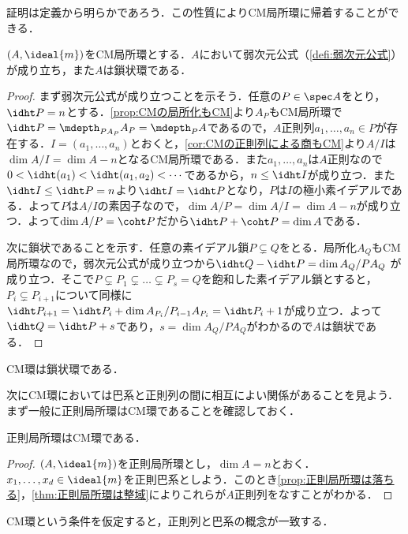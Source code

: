 証明は定義から明らかであろう．この性質によりCM局所環に帰着することができる．

\begin{thm}
	$(A,\ideal{m})$をCM局所環とする．$A$において弱次元公式（\ref{defi:弱次元公式}）が成り立ち，また$A$は鎖状環である．
\end{thm}

\begin{proof}
	まず弱次元公式が成り立つことを示そう．任意の$P\in\spec A$をとり，$\idht P=n$とする．\ref{prop:CMの局所化もCM}より$A_P$もCM局所環で$\idht P=\mdepth_{PA_P} A_P=\mdepth_P A$であるので，$A$正則列$a_1,\dots,a_n\in P$が存在する．$I=(a_1,\dots,a_n)$とおくと，\ref{cor:CMの正則列による商もCM}より$A/I$は$\dim A/I=\dim A-n$となるCM局所環である．また$a_1,\dots,a_n$は$A$正則なので$0<\idht(a_1)<\idht(a_1,a_2)<\cdots$であるから，$n\leq\idht I$が成り立つ．また$\idht I\leq\idht P=n$より$\idht I=\idht P$となり，$P$は$I$の極小素イデアルである．よって$P$は$A/I$の素因子なので，$\dim A/P=\dim A/I=\dim A-n$が成り立つ．よって$\dim A/P=\coht P$だから$\idht P+\coht P=\dim A$である．
	
	次に鎖状であることを示す．任意の素イデアル鎖$P\subsetneq Q$をとる．局所化$A_Q$もCM局所環なので，弱次元公式が成り立つから$\idht Q-\idht P=\dim A_Q/PA_Q$
	が成り立つ．そこで$P\subsetneq P_1\subsetneq \dots\subsetneq P_s=Q$を飽和した素イデアル鎖とすると，$P_i\subsetneq P_{i+1}$について同様に$\idht P_{i+1}=\idht P_i+\dim A_{P_i}/P_{i-1}A_{P_i}=\idht P_i+1$が成り立つ．よって$\idht Q=\idht P+s$であり，$s=\dim A_Q/PA_Q$がわかるので$A$は鎖状である．
\end{proof}

\begin{cor}
	CM環は鎖状環である．
\end{cor}

次にCM環においては巴系と正則列の間に相互によい関係があることを見よう．まず一般に正則局所環はCM環であることを確認しておく．

\begin{prop}[Cohen]
	正則局所環はCM環である．
\end{prop}

\begin{proof}
	$(A,\ideal{m})$を正則局所環とし，$\dim A=n$とおく．$x_1,\dots,x_d\in\ideal{m}$を正則巴系としよう．このとき\ref{prop:正則局所環は落ちる}，\ref{thm:正則局所環は整域}によりこれらが$A$正則列をなすことがわかる．
\end{proof}

CM環という条件を仮定すると，正則列と巴系の概念が一致する．

